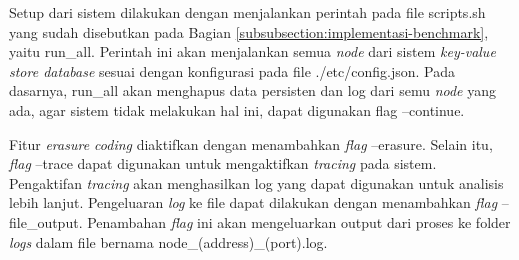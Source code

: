 Setup dari sistem dilakukan dengan menjalankan perintah pada file scripts.sh yang sudah disebutkan pada Bagian \ref{subsubsection:implementasi-benchmark}, yaitu run\_all. Perintah ini akan menjalankan semua \textit{node} dari sistem \textit{key-value store database} sesuai dengan konfigurasi pada file ./etc/config.json. Pada dasarnya, run\_all akan menghapus data persisten dan log dari semu \textit{node} yang ada, agar sistem tidak melakukan hal ini, dapat digunakan flag --continue.

Fitur \textit{erasure coding} diaktifkan dengan menambahkan \textit{flag} --erasure. Selain itu, \textit{flag} --trace dapat digunakan untuk mengaktifkan \textit{tracing} pada sistem. Pengaktifan \textit{tracing} akan menghasilkan log yang dapat digunakan untuk analisis lebih lanjut. Pengeluaran \textit{log} ke file dapat dilakukan dengan menambahkan \textit{flag} --file\_output. Penambahan \textit{flag} ini akan mengeluarkan output dari proses ke folder \textit{logs} dalam file bernama node\_(address)\_(port).log.